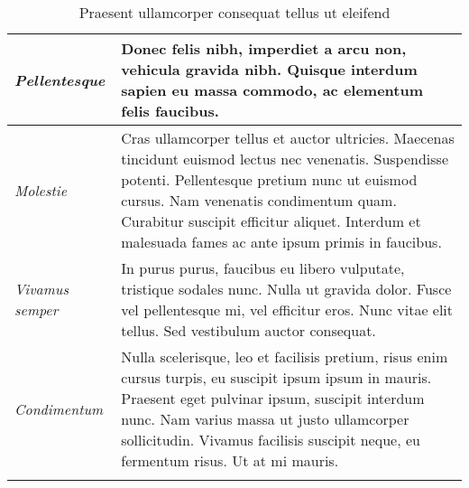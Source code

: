 \begin{center}
\begin{longtable}{ | p{} | p{} | }
		\emph{Pellentesque}
		& Donec felis nibh, imperdiet a arcu non, vehicula gravida nibh. Quisque interdum sapien eu massa commodo, ac elementum felis faucibus.
		\\ \hline

		\emph{Molestie}
		& Cras ullamcorper tellus et auctor ultricies. Maecenas tincidunt euismod lectus nec venenatis. Suspendisse potenti. Pellentesque pretium nunc ut euismod cursus. Nam venenatis condimentum quam. Curabitur suscipit efficitur aliquet. Interdum et malesuada fames ac ante ipsum primis in faucibus.
		\\ \hline

		\emph{Vivamus semper}
		& In purus purus, faucibus eu libero vulputate, tristique sodales nunc. Nulla ut gravida dolor. Fusce vel pellentesque mi, vel efficitur eros. Nunc vitae elit tellus. Sed vestibulum auctor consequat.
		\\ \hline

		\emph{Condimentum}
		& Nulla scelerisque, leo et facilisis pretium, risus enim cursus turpis, eu suscipit ipsum ipsum in mauris. Praesent eget pulvinar ipsum, suscipit interdum nunc. Nam varius massa ut justo ullamcorper sollicitudin. Vivamus facilisis suscipit neque, eu fermentum risus. Ut at mi mauris.
		\\ \hline

		\caption{Praesent ullamcorper consequat tellus ut eleifend}
		\label{tab:example-3}
	\end{longtable}
\end{center}
